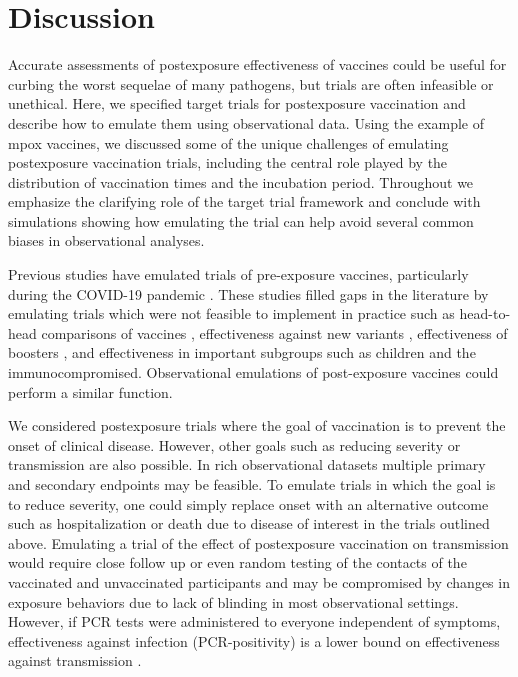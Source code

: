 \documentclass[11pt]{article}
\begin{document}
\section{Discussion} \label{sec:discussion}
Accurate assessments of postexposure effectiveness of vaccines could be useful for curbing the worst sequelae of many pathogens, but trials are often infeasible or unethical. Here, we specified target trials for postexposure vaccination and describe how to emulate them using observational data. Using the example of mpox vaccines, we discussed some of the unique challenges of emulating postexposure vaccination trials, including the central role played by the distribution of vaccination times and the incubation period. Throughout we emphasize the clarifying role of the target trial framework and conclude with simulations showing how emulating the trial can help avoid several common biases in observational analyses. 

Previous studies have emulated trials of pre-exposure vaccines, particularly during the COVID-19 pandemic \cite{dagan_bnt162b2_2021,dickerman_comparative_2022,cohen-stavi_bnt162b2_2022,barda_effectiveness_2021}. These studies filled gaps in the literature by emulating trials which were not feasible to implement in practice such as head-to-head comparisons of vaccines \cite{dickerman_comparative_2022}, effectiveness against new variants \cite{cohen-stavi_bnt162b2_2022}, effectiveness of boosters \cite{barda_effectiveness_2021,magen_fourth_2022}, and effectiveness in important subgroups such as children \cite{cohen-stavi_bnt162b2_2022} and the immunocompromised. Observational emulations of post-exposure vaccines could perform a similar function.
 
We considered postexposure trials where the goal of vaccination is to prevent the onset of clinical disease. However, other goals such as reducing severity or transmission are also possible. In rich observational datasets multiple primary and secondary endpoints may be feasible. To emulate trials in which the goal is to reduce severity, one could simply replace onset with an alternative outcome such as hospitalization or death due to disease of interest in the trials outlined above. Emulating a trial of the effect of postexposure vaccination on transmission would require close follow up or even random testing of the contacts of the vaccinated and unvaccinated participants and may be compromised by changes in exposure behaviors due to lack of blinding in most observational settings. However, if PCR tests were administered to everyone independent of symptoms, effectiveness against infection (PCR-positivity) is a lower bound on effectiveness against transmission \cite{lipsitch_interpreting_2021}. 
\end{document}
